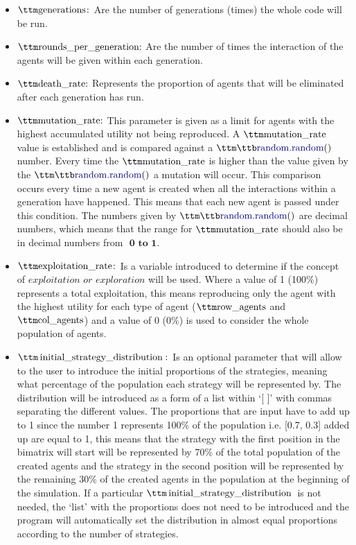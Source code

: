 \begin{itemize}
	\item $\pythoninline{generations:}$ Are the number of generations (times) the whole code will be run.
	\item $\pythoninline{rounds\_per\_generation:}$ Are the number of times the interaction of the agents will be given within each generation. 
	\item $\pythoninline{death\_rate:}$ Represents the proportion of agents that will be eliminated after each generation has run.
	\item $\pythoninline{mutation\_rate:}$ This parameter is given as a limit for agents with the highest accumulated utility not being reproduced. A $\pythoninline{mutation\_rate}$ value is established and is compared against a $\pythoninline{random.random()}$ number. Every time the $\pythoninline{mutation\_rate}$ is higher than the value given by the $\pythoninline{random.random()}$ a mutation will occur. This comparison occurs every time a new agent is created when all the interactions within a generation have happened. This means that each new agent is passed under this condition. The numbers given by $\pythoninline{random.random()}$ are decimal numbers, which means that the range for $\pythoninline{mutation\_rate}$ should also be in decimal numbers from $\textbf{ 0 to 1}$.
	\item $\pythoninline{exploitation\_rate:}$ Is a variable introduced to determine if the concept of $\textit{exploitation or exploration}$ will be used. Where a value of 1 (100$\%$) represents a total exploitation, this means reproducing only the agent with the highest utility for each type of agent ($\pythoninline{row\_agents}$ and $\pythoninline{col\_agents}$) and a value of 0 (0$\%$) is used to consider the whole population of agents.
	\item $\pythoninline{initial\_strategy\_distribution:}$ Is an optional parameter that will allow to the user to introduce the initial proportions of the strategies, meaning what percentage of the population each strategy will be represented by. The distribution will  be introduced as a form of a list within `[ ]' with commas separating the different values. The proportions that are input have to add up to 1 since the number 1 represents 100\% of the population i.e. [0.7, 0.3] added up are equal to 1, this means that the strategy with the first position in the bimatrix will start will be represented by 70\% of the total population of the created agents and the strategy in the second position will be represented by the remaining 30\% of the created agents in the population at the beginning of the simulation. If a particular $\pythoninline{initial\_strategy\_distribution}$ is not needed, the `list' with the proportions does not need to be introduced and the program will automatically set the distribution in almost equal proportions according to the number of strategies.
\end{itemize}

